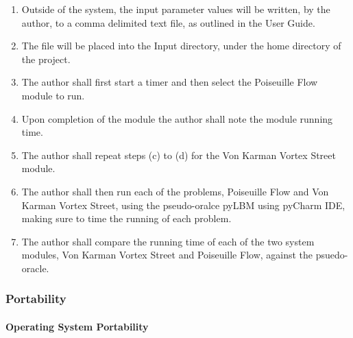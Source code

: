 \documentclass[12pt, titlepage]{article}
\begin{document}
\begin{enumerate}
\begin{enumerate}
\item Outside of the system, the input parameter values will be written, by the author, to a comma delimited text file, as outlined in the User Guide.
\item The file will be placed into the Input directory, under the home directory of the project.
\item The author shall first start a timer and then select the Poiseuille Flow module to run.
\item Upon completion of the module the author shall note the module running time.
\item The author shall repeat steps (c) to (d) for the Von Karman Vortex Street module. 
\item The author shall then run each of the problems, Poiseuille Flow and Von Karman Vortex Street, using the pseudo-oralce pyLBM using pyCharm IDE, making sure to time the running of each problem.
\item The author shall compare the running time of each of the two system modules, Von Karman Vortex Street and Poiseuille Flow, against the psuedo-oracle.\\
\end{enumerate}

\end{enumerate}

\subsubsection{Portability}
		
\paragraph{Operating System Portability}
\end{document}
